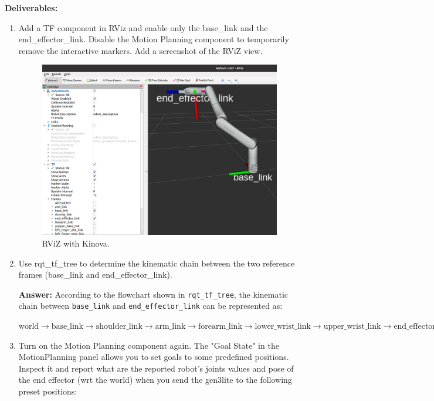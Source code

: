 \documentclass[12pt]{article}
\begin{document}
\textbf{Deliverables:}
\begin{enumerate}
    \item Add a TF component in RViz and enable only the base\_link and the end\_effector\_link. Disable the Motion Planning component to temporarily remove the interactive markers. Add a screenshot of the RViZ view.
    
    \begin{figure}[h]
        \centering\includegraphics[width=13cm]{images/kinova_rviz.png}\vspace{-4pt}
        \caption{RViZ with Kinova.}\label{fig:kinova_rviz}
        \end{figure}

    \item Use rqt\_tf\_tree to determine the kinematic chain between the two reference frames (base\_link and end\_effector\_link).
    
    \textbf{Answer: }According to the flowchart shown in \texttt{rqt_tf_tree}, the kinematic chain between \texttt{base_link} and \texttt{end_effector_link} can be represented as:

    \textit{$\text{world} \rightarrow \text{base\_link} \rightarrow \text{shoulder\_link} \rightarrow \text{arm\_link} \rightarrow \text{forearm\_link} \rightarrow \text{lower\_wrist\_link} \rightarrow \text{upper\_wrist\_link} \rightarrow \text{end\_effector\_link} \rightarrow \text{dummy\_link}$}
    
    \item Turn on the Motion Planning component again. The "Goal State" in the MotionPlanning panel allows you to set goals to some predefined positions. Inspect it and report what are the reported robot’s joints values and pose of the end effector (wrt the world) when you send the gen3lite to the following preset positions:\\
    

\end{enumerate}
\end{document}

